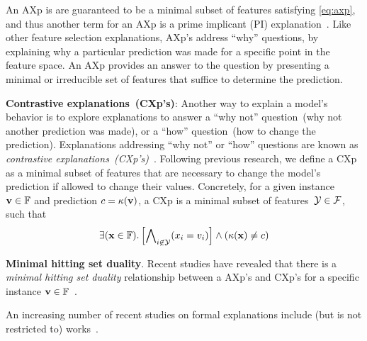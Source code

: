 An AXp is are guaranteed to be a minimal subset of features satisfying \autoref{eq:axp},
and thus another term for an AXp is a prime implicant (PI) explanation~\cite{inms-aaai19}.
%
Like other feature selection explanations, AXp's address ``why'' questions,
by explaining why a particular prediction was made for a specific point 
in the feature space.
%
An AXp provides an answer to the question by presenting a minimal or irreducible 
set of features that suffice to determine the prediction.

\textbf{Contrastive explanations~(CXp's)}: 
Another way to explain a model's behavior is to explore explanations to
answer a ``why not'' question~(why not another prediction was made), 
or a ``how'' question~(how to change the prediction).
%
Explanations addressing ``why not'' or ``how'' questions are known as
\emph{contrastive explanations~(CXp's)}~\cite{miller-aij19,inams-aiia20,msi-aaai22}. 
%
Following previous research, we define a CXp as a minimal subset of features
that are necessary to change the model's prediction if allowed to change their values.
%
Concretely, for a given instance $\mathbf{v} \in \mathbb{F}$ and 
prediction $c = \kappa(\mathbf{v})$, a CXp is a 
minimal subset of features~${\mathcal{Y}} \in {\mathcal{F}}$, such that
\begin{equation}\label{eq:cxp}
	\exists(\mathbf{x}\in\mathbb{F}).\left[\bigwedge\nolimits_{i\not\in{\mathcal{Y}}}(x_i=v_i)\right]\land(\kappa(\mathbf{x})\not=c)
\end{equation}

\textbf{Minimal hitting set duality}. 
%
Recent studies have revealed that there is a \emph{minimal hitting set duality} relationship
between a AXp's and CXp's for a specific instance $\mathbf{v} \in \mathbb{F}$~\cite{inams-aiia20,reiter-aij87}.
%
%


An increasing number of recent studies on formal explanations include (but is not restricted to)
works~\cite{msgcin-icml21,barcelo-nips21,kutyniok-jair21,darwiche-jair21,kwiatkowska-ijcai21,mazure-cikm21,tan-nips21,rubin-aaai22,msi-aaai22,an-ijcai22,leite-kr22,barcelo-nips22}.
